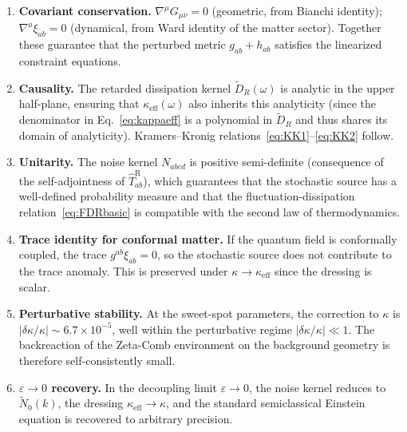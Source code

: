 \documentclass[12pt,a4paper]{article}
\begin{document}
\begin{enumerate}
  \item \textbf{Covariant conservation.}\;
    $\nabla^\mu G_{\mu\nu} = 0$ (geometric, from Bianchi identity);
    $\nabla^a \xi_{ab} = 0$ (dynamical, from Ward identity of the matter
    sector).  Together these guarantee that the perturbed metric
    $g_{ab} + h_{ab}$ satisfies the linearized constraint equations.

  \item \textbf{Causality.}\;
    The retarded dissipation kernel $\widetilde{D}_{\!R}(\omega)$ is
    analytic in the upper half-plane, ensuring that
    $\kappa_{\mathrm{eff}}(\omega)$ also inherits this analyticity
    (since the denominator in Eq.~\eqref{eq:kappaeff} is a polynomial
    in $\widetilde{D}_{\!R}$ and thus shares its domain of analyticity).
    Kramers--Kronig relations~\eqref{eq:KK1}--\eqref{eq:KK2} follow.

  \item \textbf{Unitarity.}\;
    The noise kernel $N_{abcd}$ is positive semi-definite
    (consequence of the self-adjointness of $\hat{T}^{\mathrm{R}}_{ab}$),
    which guarantees that the stochastic source has a well-defined
    probability measure and that the fluctuation-dissipation
    relation~\eqref{eq:FDRbasic} is compatible with the second law of
    thermodynamics.

  \item \textbf{Trace identity for conformal matter.}\;
    If the quantum field is conformally coupled, the trace
    $g^{ab}\xi_{ab} = 0$, so the stochastic source does not contribute
    to the trace anomaly.  This is preserved under
    $\kappa \to \kappa_{\mathrm{eff}}$ since the dressing is scalar.

  \item \textbf{Perturbative stability.}\;
    At the sweet-spot parameters, the correction to $\kappa$ is
    $|\delta\kappa/\kappa| \sim 6.7 \times 10^{-5}$, well within the
    perturbative regime $|\delta\kappa/\kappa| \ll 1$.  The backreaction
    of the Zeta-Comb environment on the background geometry is therefore
    self-consistently small.

  \item \textbf{$\varepsilon \to 0$ recovery.}\;
    In the decoupling limit $\varepsilon \to 0$, the noise kernel
    reduces to $\widetilde{N}_0(k)$, the dressing
    $\kappa_{\mathrm{eff}} \to \kappa$, and the standard semiclassical
    Einstein equation is recovered to arbitrary precision.
\end{enumerate}
\end{document}
